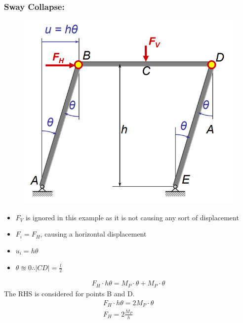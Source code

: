 \documentclass[class=report, crop=false, 12pt,a4paper]{standalone}
\begin{document}
\subsubsection{Sway Collapse:}
\begin{figure}[H]
  \centering
  \includegraphics[width = 0.55 \textwidth]{../img/beam43.PNG}
\end{figure}
\begin{itemize}
  \item $F_V$ is ignored in this example as it is not causing any sort of displacement
  \item $F_i = F_H$, causing a horizontal displacement
  \item $u_i = h\theta$
  \item $\theta \approxeq 0 \therefore |CD| = \frac{l}{2}$ 
\end{itemize}
\begin{gather}
  F_H\cdot h\theta = M_P\cdot\theta + M_P\cdot\theta 
\end{gather}
The RHS is considered for points B and D.
\begin{gather}
  F_H\cdot h\theta = 2M_P\cdot\theta \\
  F_H = 2\frac{M_P}{h}
\end{gather}
\end{document}
